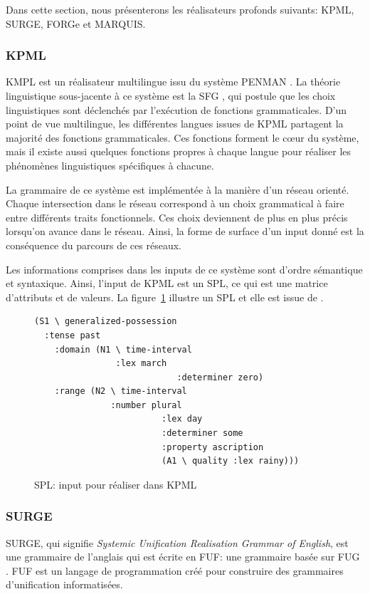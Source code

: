 Dans cette section, nous présenterons les réalisateurs profonds suivants: KPML, SURGE, FORGe et MARQUIS.

\subsubsection{KPML}
KMPL \citep{BatemanEnablingTechnologyMultilingual1997} est un réalisateur multilingue issu du système PENMAN \citep{PenmanOverview}. La théorie linguistique sous-jacente à ce système est la \ac{SFG} \citep{MatthiessenSystemicfunctionalgrammar1997}, qui postule que les choix linguistiques sont déclenchés par l'exécution de fonctions grammaticales. D'un point de vue multilingue, les différentes langues issues de KPML partagent la majorité des fonctions grammaticales. Ces fonctions forment le c\oe{}ur du système, mais il existe aussi quelques fonctions propres à chaque langue pour réaliser les phénomènes linguistiques spécifiques à chacune.

La grammaire de ce système est implémentée à la manière d'un réseau orienté. Chaque intersection dans le réseau correspond à un choix grammatical à faire entre différents traits fonctionnels. Ces choix deviennent de plus en plus précis lorsqu'on avance dans le réseau. Ainsi, la forme de surface d'un input donné est la conséquence du parcours de ces réseaux.

Les informations comprises dans les inputs de ce système sont d'ordre sémantique et syntaxique. Ainsi, l'input de KPML est un \ac{SPL}, ce qui est une matrice d'attributs et de valeurs. La figure~\ref{kpml} illustre un \ac{SPL} et elle est issue de \cite{ReiterBuildingNaturalLanguage2000}.

\begin{figure}[htb]
\caption{SPL: input pour réaliser  dans KPML}
\label{kpml}
\begin{lstlisting}[language=mate]
(S1 \ generalized-possession
  :tense past 
	:domain (N1 \ time-interval
	            :lex march
							:determiner zero)
	:range (N2 \ time-interval
	           :number plural
						 :lex day
						 :determiner some
						 :property ascription
						 (A1 \ quality :lex rainy)))
\end{lstlisting}
\end{figure}

\subsubsection{SURGE}
SURGE, qui signifie \emph{Systemic Unification Realisation Grammar of English}, est une grammaire de l'anglais \citep{Elhadad98surge:a} qui est écrite en \ac{FUF}: une grammaire basée sur \acf{FUG} \citep{KayFunctionalUnificationGrammar1984}. \ac{FUF} est un langage de programmation créé pour construire des grammaires d'unification informatisées.

